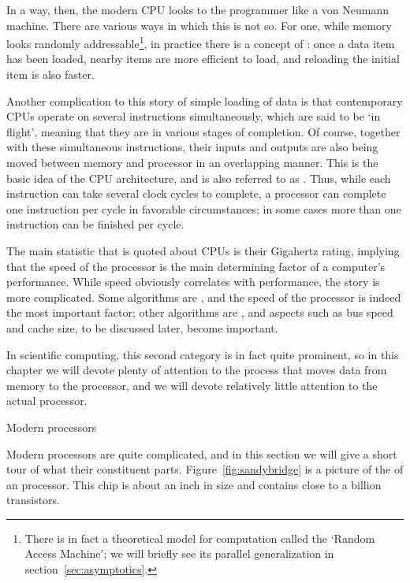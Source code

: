 In a way, then, the modern \ac{CPU} looks to the programmer like a
von Neumann machine. There are various ways in which this is not so. For
one, while memory looks randomly addressable\footnote
  {There is in fact
  a theoretical model for computation called the `Random Access
  Machine'; we will briefly see its parallel generalization in
  section~\ref{sec:asymptotics}.}, in practice there is a concept of
: once a data item has been loaded, nearby items
are more efficient to load, and reloading the initial item is also faster.

Another complication to this story of simple loading of data is that
contemporary \acp{CPU} operate on several
instructions simultaneously, which are said to be `in flight', meaning
that they are in various stages of completion. 
Of course, together with these simultaneous instructions, their inputs
and outputs are also being moved between memory and processor in an
overlapping manner.
This is the basic idea
of the  \ac{CPU} architecture, and is also referred
to as . Thus, while each
instruction can take several clock cycles to complete, a processor can
complete one instruction per cycle in favorable circumstances; in
some cases more than one instruction can be finished per cycle.
 
The main statistic that is quoted about \acp{CPU} is their 
Gigahertz rating, implying that the speed of the processor is the main
determining factor of a computer's performance. While speed obviously
correlates with performance, the story is more complicated. Some
algorithms are , and the speed of the processor
is indeed the most important factor; other algorithms are
, and aspects such as bus speed and cache
size, to be discussed later,
become important.

In scientific computing, this second category is in fact quite
prominent, so in this chapter we will devote plenty of attention to
the process that moves data from memory to the processor, and we will
devote relatively little attention to the actual processor.

 {Modern processors}
\label{sec:fp}

Modern processors are quite complicated, and in this section we will
give a short tour of what their constituent parts.
Figure~\ref{fig:sandybridge} is a picture of the 
of an  processor.
This chip is about an inch in size and contains close
to a billion transistors.

